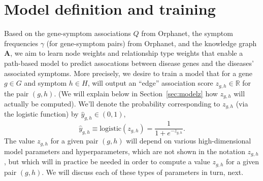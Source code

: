 \documentclass[11pt,notitlepage,english]{article}
\begin{document}
\section{Model definition and training}
Based on the gene-symptom associations $Q$ from Orphanet, the
symptom frequencies $\gamma$ (for gene-symptom pairs) from Orphanet, and the
knowledge graph ${\boldsymbol A}$, we aim to learn node weights and relationship type weights that
enable a path-based model to predict assocations between disease genes and the
diseases' associated symptoms.  More precisely, we desire to train a model that
for a gene $g \in G$ and symptom $h \in H$, will output an
``edge'' association score $z_{g,h} \in {\mathbb R}$ for the pair $(g, h)$.
(We will explain below in Section~\ref{sec:modelz} how
$z_{g,h}$ will actually be computed). We'll denote the probability corresponding
to $z_{g,h}$ (via the logistic function) by $\widehat{y}_{g,h} \in (0,1)$,
\begin{equation}
  \label{eq:defyhat}
  \widehat{y}_{g,h} \equiv \textrm{logistic}(z_{g,h}) = \frac{1}{1 + e^{-z_{g,h}}}.
\end{equation}
The value $z_{g,h}$ for a given pair $(g,h)$ will depend on various high-dimensional
model parameters and hyperparameters, which are not shown in the notation $z_{g,h}$,
but which will in practice be needed in order to compute a value $z_{g,h}$ for a given pair $(g,h)$.
We will discuss each of these types of parameters in turn, next.
\end{document}
